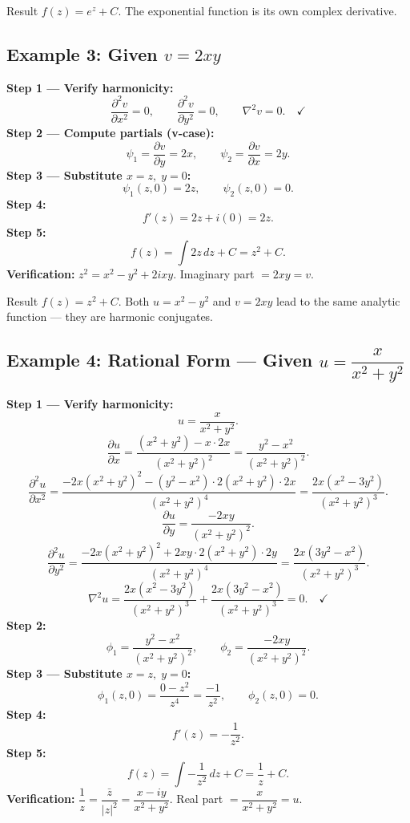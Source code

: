 \documentclass[12pt,a4paper]{article}
\begin{document}
\begin{learnbox}{Result}
\( f(z) = e^z + C \). The exponential function is its own complex derivative.
\end{learnbox}

\subsection*{Example 3: Given \( v = 2xy \)}

\textbf{Step 1 --- Verify harmonicity:}
\[
\frac{\partial^2 v}{\partial x^2} = 0, \qquad \frac{\partial^2 v}{\partial y^2} = 0, \qquad \nabla^2 v = 0. \quad \checkmark
\]
\textbf{Step 2 --- Compute partials (v-case):}
\[
\psi_1 = \frac{\partial v}{\partial y} = 2x, \qquad \psi_2 = \frac{\partial v}{\partial x} = 2y.
\]
\textbf{Step 3 --- Substitute \( x=z,\; y=0 \):}
\[
\psi_1(z,0) = 2z, \qquad \psi_2(z,0) = 0.
\]
\textbf{Step 4:}
\[
f'(z) = 2z + i(0) = 2z.
\]
\textbf{Step 5:}
\[
f(z) = \int 2z\,dz + C = z^2 + C.
\]
\textbf{Verification:} \( z^2 = x^2-y^2 + 2ixy \). Imaginary part \( = 2xy = v \). \checkmark

\begin{learnbox}{Result}
\( f(z) = z^2 + C \). Both \( u = x^2-y^2 \) and \( v=2xy \) lead to the same analytic function --- they are harmonic conjugates.
\end{learnbox}

\subsection*{Example 4: Rational Form --- Given \( u = \dfrac{x}{x^2+y^2} \)}

\textbf{Step 1 --- Verify harmonicity:}
\[
u = \frac{x}{x^2+y^2}.
\]
\[
\frac{\partial u}{\partial x} = \frac{(x^2+y^2) - x\cdot 2x}{(x^2+y^2)^2} = \frac{y^2-x^2}{(x^2+y^2)^2}.
\]
\[
\frac{\partial^2 u}{\partial x^2} = \frac{-2x(x^2+y^2)^2 - (y^2-x^2)\cdot 2(x^2+y^2)\cdot 2x}{(x^2+y^2)^4}
= \frac{2x(x^2-3y^2)}{(x^2+y^2)^3}.
\]
\[
\frac{\partial u}{\partial y} = \frac{-2xy}{(x^2+y^2)^2}.
\]
\[
\frac{\partial^2 u}{\partial y^2} = \frac{-2x(x^2+y^2)^2 + 2xy \cdot 2(x^2+y^2)\cdot 2y}{(x^2+y^2)^4}
= \frac{2x(3y^2-x^2)}{(x^2+y^2)^3}.
\]
\[
\nabla^2 u = \frac{2x(x^2-3y^2)}{(x^2+y^2)^3} + \frac{2x(3y^2-x^2)}{(x^2+y^2)^3} = 0. \quad \checkmark
\]
\textbf{Step 2:}
\[
\phi_1 = \frac{y^2-x^2}{(x^2+y^2)^2}, \qquad \phi_2 = \frac{-2xy}{(x^2+y^2)^2}.
\]
\textbf{Step 3 --- Substitute \( x=z,\; y=0 \):}
\[
\phi_1(z,0) = \frac{0 - z^2}{z^4} = \frac{-1}{z^2}, \qquad \phi_2(z,0) = 0.
\]
\textbf{Step 4:}
\[
f'(z) = -\frac{1}{z^2}.
\]
\textbf{Step 5:}
\[
f(z) = \int -\frac{1}{z^2}\,dz + C = \frac{1}{z} + C.
\]
\textbf{Verification:} \( \dfrac{1}{z} = \dfrac{\bar{z}}{|z|^2} = \dfrac{x-iy}{x^2+y^2} \). Real part \( = \dfrac{x}{x^2+y^2} = u \). \checkmark
\end{document}
